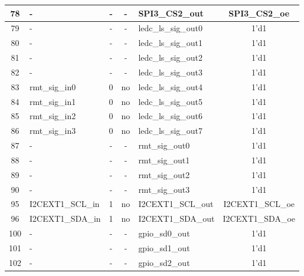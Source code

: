 \begin{longtable}[c]{|c|l|c|c|l|c|}
 78  &                        -  &  -  &    -  &          SPI3\_CS2\_out  &      SPI3\_CS2\_oe  \\\hline
 79  &                        -  &  -  &    -  &     ledc\_ls\_sig\_out0  &               1'd1  \\\hline
 80  &                        -  &  -  &    -  &     ledc\_ls\_sig\_out1  &               1'd1  \\\hline
 81  &                        -  &  -  &    -  &     ledc\_ls\_sig\_out2  &               1'd1  \\\hline
 82  &                        -  &  -  &    -  &     ledc\_ls\_sig\_out3  &               1'd1  \\\hline
 83  &            rmt\_sig\_in0  &  0  &   no  &     ledc\_ls\_sig\_out4  &               1'd1  \\\hline
 84  &            rmt\_sig\_in1  &  0  &   no  &     ledc\_ls\_sig\_out5  &               1'd1  \\\hline
 85  &            rmt\_sig\_in2  &  0  &   no  &     ledc\_ls\_sig\_out6  &               1'd1  \\\hline
 86  &            rmt\_sig\_in3  &  0  &   no  &     ledc\_ls\_sig\_out7  &               1'd1  \\\hline
 87  &                        -  &  -  &    -  &          rmt\_sig\_out0  &               1'd1  \\\hline
 88  &                        -  &  -  &    -  &          rmt\_sig\_out1  &               1'd1  \\\hline
 89  &                        -  &  -  &    -  &          rmt\_sig\_out2  &               1'd1  \\\hline
 90  &                        -  &  -  &    -  &          rmt\_sig\_out3  &               1'd1  \\\hline
 95  &         I2CEXT1\_SCL\_in  &  1  &   no  &       I2CEXT1\_SCL\_out  &   I2CEXT1\_SCL\_oe  \\\hline
 96  &         I2CEXT1\_SDA\_in  &  1  &   no  &       I2CEXT1\_SDA\_out  &   I2CEXT1\_SDA\_oe  \\\hline
100  &                        -  &  -  &    -  &          gpio\_sd0\_out  &               1'd1  \\\hline
101  &                        -  &  -  &    -  &          gpio\_sd1\_out  &               1'd1  \\\hline
102  &                        -  &  -  &    -  &          gpio\_sd2\_out  &               1'd1  \\\hline

\end{longtable}
